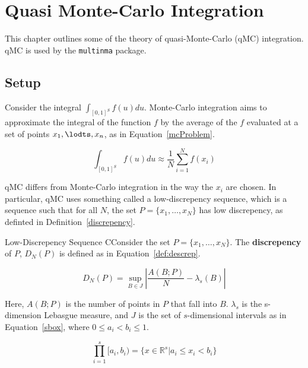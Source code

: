 \chapter{Quasi Monte-Carlo Integration}

This chapter outlines some of the theory of quasi-Monte-Carlo (qMC) integration. qMC is used by the \verb|multinma| package.

\section{Setup}

Consider the integral $\int_{[0,1]^S}f(u)du$. Monte-Carlo integration aims to approximate the integral of the function $f$ by the average of the $f$ evaluated at a set of points $x_1, \lodts, x_n$, as in Equation~\ref{mcProblem}.

\begin{equation}
    \int_{[0,1]^S}f(u)du \approx \frac{1}{N}\sum_{i = 1}^{N}f(x_i)
    \label{mcProblem}
\end{equation}

qMC differs from Monte-Carlo integration in the way the $x_i$ are chosen. In particular, qMC uses something called a low-discrepency sequence, which is a sequence such that for all $N$, the set $P = \{x_1, \ldots, x_N\}$ has low discrepency, as definted in Definition~\ref{discrepency}.

\begin{definition}{Low-Discrepency Sequence}
    CConsider the set $P = \{x_1, \ldots, x_N\}$. The \textbf{discrepency} of $P$, $D_N(P)$ is defined as in Equation~\ref{def:descrep}.

    \begin{equation}
        D_N(P) = \sup_{B \in J}\left|\frac{A(B;P)}{N} - \lambda_s(B)\right|
        \label{def:descrep}
    \end{equation}

    Here, $A(B;P)$ is the number of points in $P$ that fall into $B$. $\lambda_s$ is the s-dimension Lebasgue measure, and $J$ is the set of $s$-dimensional intervals as in Equation~\ref{sbox}, where $0 \leq a_i < b_i \leq 1$.
    
    \begin{equation}
        \prod_{i = 1}^{s} [a_i,b_i) = \{x \in \mathbb{R}^s | a_i \leq x_i < b_i \}
        \label{sbox}
    \end{equation}
\label{discrepency}
\end{definition}


